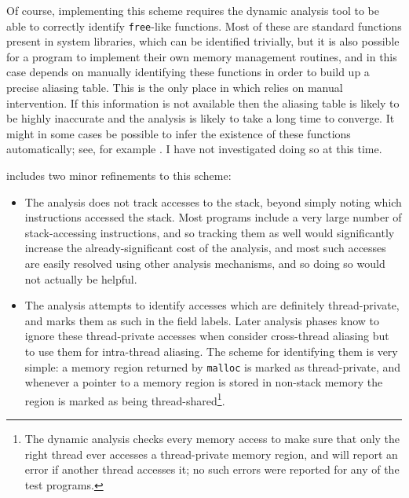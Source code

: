 Of course, implementing this scheme requires the dynamic analysis tool
to be able to correctly identify \verb|free|-like functions.  Most of
these are standard functions present in system libraries, which can be
identified trivially, but it is also possible for a program to
implement their own memory management routines, and in this case
{\technique} depends on manually identifying these functions in order
to build up a precise aliasing table.  This is the only place in which
{\technique} relies on manual intervention.  If this information is
not available then the aliasing table is likely to be highly
inaccurate and the analysis is likely to take a long time to converge.
It might in some cases be possible to infer the existence of these
functions automatically; see, for example .  I have not
investigated doing so at this time.

{\Implementation} includes two minor refinements to this scheme:

\begin{itemize}
\item
  The analysis does not track accesses to the stack, beyond simply
  noting which instructions accessed the stack.  Most programs include
  a very large number of stack-accessing instructions, and so tracking
  them as well would significantly increase the already-significant
  cost of the analysis, and most such accesses are easily resolved
  using other analysis mechanisms, and so doing so would not actually
  be helpful.
\item
  The analysis attempts to identify accesses which are definitely
  thread-private, and marks them as such in the field labels.  Later
  analysis phases know to ignore these thread-private accesses when
  consider cross-thread aliasing but to use them for intra-thread
  aliasing.  The scheme for identifying them is very simple: a memory
  region returned by \verb|malloc| is marked as thread-private, and
  whenever a pointer to a memory region is stored in non-stack memory
  the region is marked as being thread-shared\footnote{The dynamic
    analysis checks every memory access to make sure that only the
    right thread ever accesses a thread-private memory region, and
    will report an error if another thread accesses it; no such errors
    were reported for any of the test programs.}.
\end{itemize}

